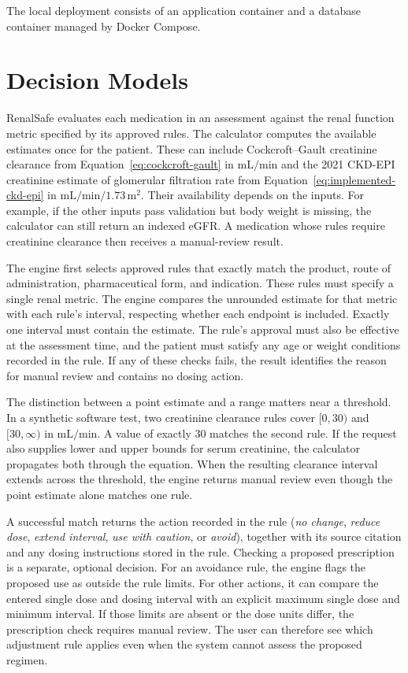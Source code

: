 \documentclass[12pt,a4paper,twoside]{book}
\begin{document}
The local deployment consists of an application container and a database container managed by Docker Compose.

\section{Decision Models}
\label{sec:decision-models}

RenalSafe evaluates each medication in an assessment against the renal function metric specified by its approved rules.
The calculator computes the available estimates once for the patient.
These can include Cockcroft--Gault creatinine clearance from Equation~\eqref{eq:cockcroft-gault} in \(\mathrm{mL/min}\) and the 2021 CKD-EPI creatinine estimate of glomerular filtration rate from Equation~\eqref{eq:implemented-ckd-epi} in \(\mathrm{mL/min}/1.73\,\mathrm{m}^{2}\).
Their availability depends on the inputs. For example, if the other inputs pass validation but body weight is missing, the calculator can still return an indexed eGFR. A medication whose rules require creatinine clearance then receives a manual-review result.

The engine first selects approved rules that exactly match the product, route of administration, pharmaceutical form, and indication.
These rules must specify a single renal metric. The engine compares the unrounded estimate for that metric with each rule's interval, respecting whether each endpoint is included.
Exactly one interval must contain the estimate. The rule's approval must also be effective at the assessment time, and the patient must satisfy any age or weight conditions recorded in the rule.
If any of these checks fails, the result identifies the reason for manual review and contains no dosing action.

The distinction between a point estimate and a range matters near a threshold. In a synthetic software test, two creatinine clearance rules cover \([0,30)\) and \([30,\infty)\) in \(\mathrm{mL/min}\). A value of exactly \(30\) matches the second rule.
If the request also supplies lower and upper bounds for serum creatinine, the calculator propagates both through the equation. When the resulting clearance interval extends across the threshold, the engine returns manual review even though the point estimate alone matches one rule.

A successful match returns the action recorded in the rule (\textit{no change}, \textit{reduce dose}, \textit{extend interval}, \textit{use with caution}, or \textit{avoid}), together with its source citation and any dosing instructions stored in the rule.
Checking a proposed prescription is a separate, optional decision. For an avoidance rule, the engine flags the proposed use as outside the rule limits. For other actions, it can compare the entered single dose and dosing interval with an explicit maximum single dose and minimum interval.
If those limits are absent or the dose units differ, the prescription check requires manual review. The user can therefore see which adjustment rule applies even when the system cannot assess the proposed regimen.
\end{document}
